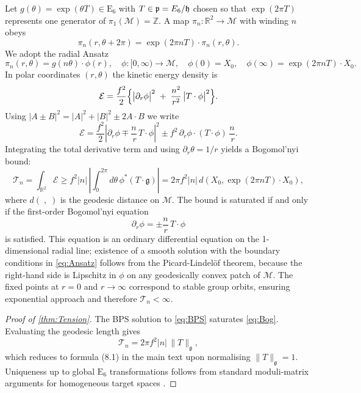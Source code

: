 \documentclass[pdflatex,sn-mathphys-num]{sn-jnl}
\theoremstyle{thmstyleone}
\theoremstyle{thmstyletwo}%
\theoremstyle{thmstylethree}%
\newcommand{\E}[1]{\mathrm{E_{#1}}}
\newcommand{\ESix}{\E{6}}
\begin{document}
\begin{appendices}
Let \(g(\theta)=\exp(\theta T)\in\ESix\) with
\(T\in\mathfrak p=\mathfrak \ESix/\mathfrak h\) chosen so that
\(\exp(2\pi T)\) represents one generator of
\(\pi_{1}(\mathcal M)=\mathbb Z\).  A map
\(\pi_n:\mathbb R^{2}\to\mathcal M\) with winding \(n\) obeys
\[
  \pi_n(r,\theta+2\pi)=\exp(2\pi nT)\cdot\pi_n(r,\theta).
\]
We adopt the radial Ansatz
\begin{equation}
  \pi_n(r,\theta)=g(n\theta)\cdot\phi(r),
  \quad
  \phi: [0,\infty)\to\mathcal M,
  \quad
  \phi(0)=X_{0},
  \quad
  \phi(\infty)=\exp(2\pi nT)\cdot X_{0}.
\label{eq:Ansatz}
\end{equation}
In polar coordinates \((r,\theta)\) the kinetic energy density is
\[
  \mathcal E=\frac{f^{2}}{2}\Bigl\{
     \bigl|\partial_{r}\phi\bigr|^{2}
     \;+\;
     \frac{n^{2}}{r^{2}}\,
     \bigl|T\cdot\phi\bigr|^{2}
  \Bigr\}.
\]
Using \(\bigl|A\pm B\bigr|^{2}=|A|^{2}+|B|^{2}\pm2A\cdot B\) we write
\[
  \mathcal E
  =\frac{f^{2}}{2}\left|
     \partial_{r}\phi
     \mp\frac{n}{\,r}\,T\cdot\phi
   \right|^{2}
  \pm f^{2}\,
     \partial_{r}\phi\cdot(T\cdot\phi)\,
     \frac{n}{\,r}.
\]
Integrating the total derivative term and using
\(\partial_{r}\theta=1/r\) yields a Bogomol’nyi bound:
\begin{equation}
  \mathcal T_{n}
  =\int_{\mathbb R^{2}}\mathcal E
  \ge
  f^{2}|n|\,
  \left|\int_{0}^{2\pi}d\theta\,
          \phi^{*}(T\cdot\mathfrak g)\right|
  = 2\pi f^{2}|n|\,d(X_{0},\exp(2\pi nT)\cdot X_{0}),
\label{eq:Bog}
\end{equation}
where \(d(\;,\;)\) is the geodesic distance on \(\mathcal M\).
The bound is saturated if and only if the first-order
Bogomol’nyi equation
\begin{equation}
  \partial_{r}\phi
  =\pm\frac{n}{r}\,T\cdot\phi
\label{eq:BPS}
\end{equation}
is satisfied. This equation is an ordinary differential equation on the
1-dimensional radial line; existence of a smooth solution with the
boundary conditions in \eqref{eq:Ansatz} follows from the Picard-Lindelöf theorem, because the right-hand side is Lipschitz in \(\phi\) on any geodesically convex
patch of \(\mathcal M\).  The fixed points at \(r=0\) and
\(r\to\infty\) correspond to stable group orbits, ensuring exponential
approach and therefore \(\mathcal T_{n}<\infty\).

\begin{proof}[Proof of \autoref{thm:Tension}]
The BPS solution to \eqref{eq:BPS} saturates
\eqref{eq:Bog}.  Evaluating the geodesic length gives
\[
  \mathcal T_{n}
  =2\pi f^{2}|n|\,
    \lVert T\rVert_{\mathfrak g},
\]
which reduces to formula (8.1) in the main text upon normalising
\(\lVert T\rVert_{\mathfrak g}=1\).
Uniqueness up to global $\ESix$ transformations follows from standard
moduli-matrix arguments for homogeneous target spaces
\cite{EtoNitta:2013}.
\end{proof}


\end{appendices}
\end{document}
